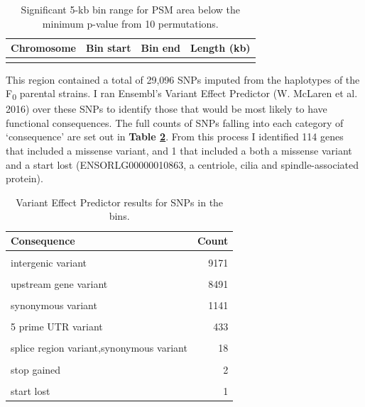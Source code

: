\documentclass[
]{book}
\begin{document}
\begin{table}

\caption{\label{tab:somite-sig-psm-tbl}Significant 5-kb bin range for PSM area below the minimum p-value from 10 permutations.}
\centering
\begin{tabular}[t]{rrrr}
\toprule
Chromosome & Bin start & Bin end & Length (kb)\\
\midrule
\cellcolor{gray!6}{3} & \cellcolor{gray!6}{20375001} & \cellcolor{gray!6}{26285000} & \cellcolor{gray!6}{5910}\\
\bottomrule
\end{tabular}
\end{table}

This region contained a total of 29,096 SNPs imputed from the haplotypes of the F\textsubscript{0} parental strains.
I ran Ensembl's Variant Effect Predictor (W. McLaren et al. 2016) over these SNPs to identify those that would be most likely to have functional consequences. The full counts of SNPs falling into each category of `consequence' are set out in \textbf{Table \ref{tab:psm-consequence-tbl}}. From this process I identified 114 genes that included a missense variant, and 1 that included a both a missense variant and a start lost (ENSORLG00000010863, a centriole, cilia and spindle-associated protein).

\begin{table}

\caption{\label{tab:psm-consequence-tbl}Variant Effect Predictor results for SNPs in the bins.}
\centering
\begin{tabular}[t]{lr}
\toprule
Consequence & Count\\
\midrule
\cellcolor{gray!6}{intron variant} & \cellcolor{gray!6}{23189}\\
intergenic variant & 9171\\
\cellcolor{gray!6}{downstream gene variant} & \cellcolor{gray!6}{8894}\\
upstream gene variant & 8491\\
\cellcolor{gray!6}{3 prime UTR variant} & \cellcolor{gray!6}{2104}\\
\addlinespace
synonymous variant & 1141\\
\cellcolor{gray!6}{missense variant} & \cellcolor{gray!6}{716}\\
5 prime UTR variant & 433\\
\cellcolor{gray!6}{splice region variant,intron variant} & \cellcolor{gray!6}{184}\\
splice region variant,synonymous variant & 18\\
\addlinespace
\cellcolor{gray!6}{missense variant,splice region variant} & \cellcolor{gray!6}{7}\\
stop gained & 2\\
\cellcolor{gray!6}{splice donor variant} & \cellcolor{gray!6}{1}\\
start lost & 1\\
\bottomrule
\end{tabular}
\end{table}
\end{document}

